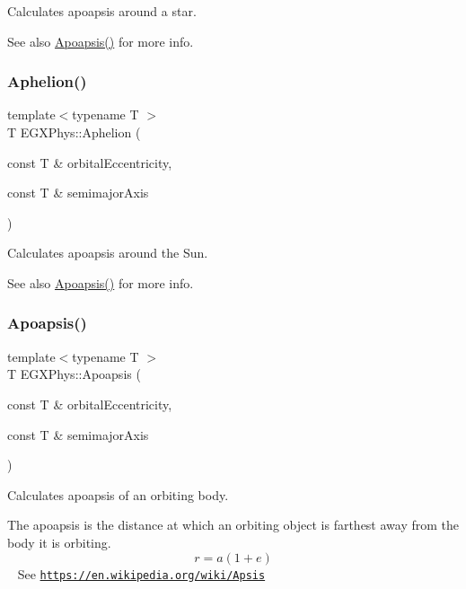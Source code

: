 Calculates apoapsis around a star. 

\begin{DoxySeeAlso}{See also}
\mbox{\hyperlink{group___apoapsis_gaf962e650bf84a568458e8eb39b1c61ba}{Apoapsis()}} for more info. 
\end{DoxySeeAlso}
\mbox{\label{group___apoapsis_ga77dadb4d082a441c8e85203c983722c7}} 
\subsubsection{\texorpdfstring{Aphelion()}{Aphelion()}}
{\footnotesize\ttfamily template$<$typename T $>$ \\
T E\+G\+X\+Phys\+::\+Aphelion (\begin{DoxyParamCaption}\item[{const T \&}]{orbital\+Eccentricity,  }\item[{const T \&}]{semimajor\+Axis }\end{DoxyParamCaption})}



Calculates apoapsis around the Sun. 

\begin{DoxySeeAlso}{See also}
\mbox{\hyperlink{group___apoapsis_gaf962e650bf84a568458e8eb39b1c61ba}{Apoapsis()}} for more info. 
\end{DoxySeeAlso}
\mbox{\label{group___apoapsis_gaf962e650bf84a568458e8eb39b1c61ba}} 
\subsubsection{\texorpdfstring{Apoapsis()}{Apoapsis()}}
{\footnotesize\ttfamily template$<$typename T $>$ \\
T E\+G\+X\+Phys\+::\+Apoapsis (\begin{DoxyParamCaption}\item[{const T \&}]{orbital\+Eccentricity,  }\item[{const T \&}]{semimajor\+Axis }\end{DoxyParamCaption})}



Calculates apoapsis of an orbiting body. 

The apoapsis is the distance at which an orbiting object is farthest away from the body it is orbiting. \[r=a(1+e)\] ~\newline
See \href{https://en.wikipedia.org/wiki/Apsis}{\tt https\+://en.\+wikipedia.\+org/wiki/\+Apsis}

